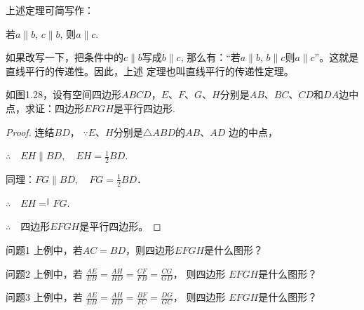 上述定理可简写作：
\begin{blk}{}
  若$a\parallel b$, $c\parallel b$, 则$a\parallel c$.
\end{blk}

如果改写一下，把条件中的$c\parallel b$写成$b\parallel c$, 那么有：“若$a\parallel b$, $b\parallel c$则$a\parallel c$”。这就是直线平行的传递性。因此，上述
定理也叫直线平行的传递性定理。


\begin{example}
  如图1.28，设有空间四边形$ABCD$，$E$、$F$、$G$、$H$分别是$AB$、$BC$、$CD$和$DA$边中点，求证：四边形$EFGH$是平行四边形.
\end{example}

\begin{figure}[htp]
  \centering
{}
  \caption{}
\end{figure}


\begin{proof}
连结$BD$，
$\because E$、$H$分别是$\triangle ABD$的$AB$、$AD$
边的中点，

$\therefore\quad EH\parallel BD,\quad EH=\frac{1}{2}BD$.

同理：$FG\parallel BD,\quad FG=\frac{1}{2}BD$．

$\therefore\quad EH\displaystyle\mathop{=}^{\parallel} FG$.

$\therefore\quad $四边形$EFGH$是平行四边形。
\end{proof}

\begin{blk}{问题1}
 上例中，若$AC=BD$，则四边形$EFGH$是什么图形？
\end{blk}

\begin{blk}{问题2}
  上例中，若
$\frac{AE}{EB}=\frac{AH}{HD}=\frac{CF}{FB}=\frac{CG}{GD}$，
则四边形
$EFGH$是什么图形？
\end{blk}

\begin{blk}{问题3}
  上例中，若
  $\frac{AE}{EB}=\frac{AH}{HD}=\frac{BF}{FC}=\frac{DG}{GC}$，
则四边形
$EFGH$是什么图形？
\end{blk}

